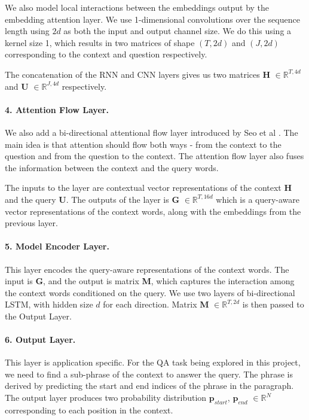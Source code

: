 We also model local interactions between the embeddings output by the embedding attention layer. We use 1-dimensional convolutions over the sequence length using $2d$ as both the input and output  channel size. We do this using a kernel size 1,  which results in two matrices of shape $(T, 2d)$ and $(J, 2d)$ corresponding to the context and question respectively. 

The concatenation of the RNN and CNN layers gives us two matrices \textbf{H} $\in \mathbb{R}^{T, 4d}$ and \textbf{U} $\in \mathbb{R}^{J, 4d}$ respectively.   

\paragraph{4. Attention Flow Layer.} We also add a bi-directional attentional flow layer introduced by Seo et al \cite{seo2016bidirectional}. The main idea is that attention should flow both ways - from the context to the question and from the question to the context. The attention flow layer also fuses the information between the context and the query words. 

The inputs to the layer are contextual vector representations of the context \textbf{H} and the query \textbf{U}. The outputs of the layer is \textbf{G} $\in \mathbb{R}^{T, 16d}$ which is a query-aware vector representations of the context words, along with the embeddings from the previous layer.
 
\paragraph{5. Model Encoder Layer.} This layer encodes the query-aware representations of the context words. The input is \textbf{G}, and the output is matrix \textbf{M}, which captures the interaction among the context words conditioned on the query. We use two layers of bi-directional LSTM, with hidden size $d$ for each direction. Matrix \textbf{M} $\in \mathbb{R}^{T, 2d}$  is then passed to the Output Layer. 

\paragraph{6. Output Layer.} This layer is application specific.  For the QA task being explored in this project, we need to find a sub-phrase of the context to answer the query. The phrase is derived by predicting the start and end indices of the phrase in the paragraph. 
The output layer produces two probability distribution $\bm{p}_{start}$, $\bm{p}_{end}$  $\in \mathbb{R}^N$ corresponding to each position in the context. 

